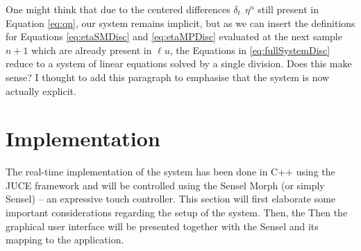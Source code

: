 \documentclass[dvipsnames, pdftex]{article}
\def\SWcomment[#1]{\textcolor{Bittersweet}{#1}}
\begin{document}
One might think that due to the centered differences $\delta_{t\cdot}\eta^n$ still present in Equation \eqref{eq:qn}, our system remains implicit, but as we can insert the definitions for Equations \eqref{eq:etaSMDisc} and \eqref{eq:etaMPDisc} evaluated at the next sample $n+1$ which are already present in $\ell u$, the Equations in \eqref{eq:fullSystemDisc} reduce to a system of linear equations solved by a single division. \SWcomment[Does this make sense? I thought to add this paragraph to emphasise that the system is now actually explicit.]

\section{Implementation}
The real-time implementation of the system has been done in C++ using the JUCE framework \cite{JUCE2020} and will be controlled using the Sensel Morph (or simply Sensel) -- an expressive touch controller. This section will first elaborate some important considerations regarding the setup of the system. Then, the  Then the graphical user interface will be presented together with the Sensel and its mapping to the application.
\end{document}
